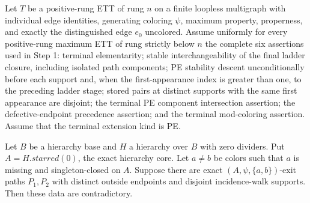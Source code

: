 \begin{helper}
Let $T$ be a positive-rung ETT of rung $n$ on a finite loopless
multigraph with individual edge identities, generating coloring $\psi$,
maximum property, properness, and exactly the distinguished edge $e_0$
uncolored.  Assume uniformly for every positive-rung maximum ETT of rung
strictly below $n$ the complete six assertions used in Step 1:
terminal elementarity; stable interchangeability of the final ladder
closure, including isolated path components; PE stability descent unconditionally before each support and, when the
first-appearance index is greater than one, to the preceding ladder stage;
stored pairs at distinct supports with the same first appearance are disjoint; the terminal PE component intersection assertion; the
defective-endpoint precedence assertion; and the terminal mod-coloring
assertion.  Assume that the terminal extension kind is PE.

Let $B$ be a hierarchy base and $H$ a hierarchy over $B$ with zero
dividers.  Put $A=H.\mathit{starred}(0)$, the exact hierarchy core.  Let
$a\ne b$ be colors such that $a$ is missing and singleton-closed on $A$.
Suppose there are exact $(A,\psi,\{a,b\})$-exit paths $P_1,P_2$ with
distinct outside endpoints and disjoint incidence-walk supports.  Then
these data are contradictory.
\end{helper}
